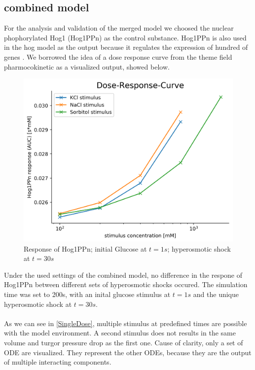 \subsection{combined model}
For the analysis and validation of the merged model we choosed the nuclear phophorylated Hog1 (Hog1PPn) as the control substance. Hog1PPn is also used in the hog model as the output because it regulates the expression of hundred of genes \cite{Zi_2010}. We borrowed the idea of a dose response curve from the theme field pharmocokinetic as a visualized output, showed below.  \\
\begin{figure}[h!]
	\begin{center}
		\begin{minipage}{0,8\textwidth}
			
			\includegraphics[width=\textwidth]{picture/Drug_response.png}
			\caption{Response of Hog1PPn; initial Glucose at $t=1s$; hyperosmotic shock at $t=30s$} 
			\label{DrugResponseCurve} 
		\end{minipage}
	\end{center}
\end{figure}
Under the used settings of the combined model, no difference in the respone of Hog1PPn between different sets of hyperosmotic shocks occured. The simulation time was set to 200s, with an inital glucose stimulus at $t=1s$ and the unique hyperosmotic shock at $t=30s$. \\\\
As we can see in \ref{SingleDose}, multiple stimulus at predefined times are possible with the model environment. A second stimulus does not results in the same volume and turgor pressure drop as the first one. Cause of clarity, only a set of ODE are visualized. They represent the other ODEs, because they are the output of multiple interacting components. 
